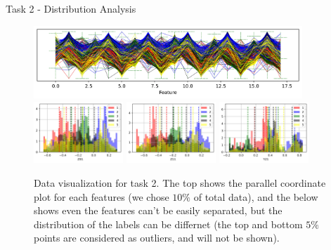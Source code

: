 \documentclass{beamer}
\begin{document}
\begin{frame}{Task 2 - Distribution Analysis}

  \begin{figure}[H]
    \centering
    \includegraphics[width=0.9\textwidth]{../code/Task2/Analysis/PC.jpg} \\
    \includegraphics[width=0.3\textwidth]{../code/Task2/Analysis/Hist-2.jpg}
    \includegraphics[width=0.3\textwidth]{../code/Task2/Analysis/Hist-5.jpg}
    \includegraphics[width=0.3\textwidth]{../code/Task2/Analysis/Hist-7.jpg}
    \caption{Data visualization for task 2. The top shows the parallel coordinate plot for each features (we chose $10\%$ of total data), and the below shows even the features can't be easily separated, but the distribution of the labels can be differnet (the top and bottom $5\%$ points are considered as outliers, and will not be shown).}
  \end{figure}

\end{frame}
\end{document}
